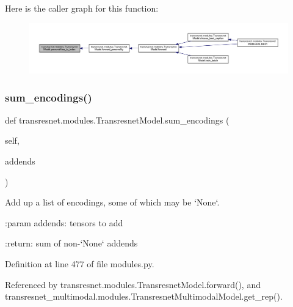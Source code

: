 Here is the caller graph for this function\+:
\nopagebreak
\begin{figure}[H]
\begin{center}
\leavevmode
\includegraphics[width=350pt]{classtransresnet_1_1modules_1_1TransresnetModel_a850b8d781e749d3242788dc8e344b8fe_icgraph}
\end{center}
\end{figure}
\mbox{\label{classtransresnet_1_1modules_1_1TransresnetModel_ad510db9128829888d74b02e520cad7b9}} 
\subsubsection{\texorpdfstring{sum\+\_\+encodings()}{sum\_encodings()}}
{\footnotesize\ttfamily def transresnet.\+modules.\+Transresnet\+Model.\+sum\+\_\+encodings (\begin{DoxyParamCaption}\item[{}]{self,  }\item[{}]{addends }\end{DoxyParamCaption})}

\begin{DoxyVerb}Add up a list of encodings, some of which may be `None`.

:param addends:
    tensors to add

:return:
    sum of non-`None` addends
\end{DoxyVerb}
 

Definition at line 477 of file modules.\+py.



Referenced by transresnet.\+modules.\+Transresnet\+Model.\+forward(), and transresnet\+\_\+multimodal.\+modules.\+Transresnet\+Multimodal\+Model.\+get\+\_\+rep().

